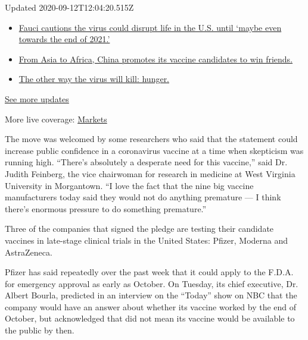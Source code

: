 Updated 2020-09-12T12:04:20.515Z

\begin{itemize}
\tightlist
\item
  \href{https://www.nytimes3xbfgragh.onion/2020/09/11/world/covid-19-coronavirus.html?action=click\&pgtype=Article\&state=default\&region=MAIN_CONTENT_1\&context=storylines_live_updates\#link-dfb8a16}{Fauci
  cautions the virus could disrupt life in the U.S. until `maybe even
  towards the end of 2021.'}
\item
  \href{https://www.nytimes3xbfgragh.onion/2020/09/11/world/covid-19-coronavirus.html?action=click\&pgtype=Article\&state=default\&region=MAIN_CONTENT_1\&context=storylines_live_updates\#link-7104d154}{From
  Asia to Africa, China promotes its vaccine candidates to win friends.}
\item
  \href{https://www.nytimes3xbfgragh.onion/2020/09/11/world/covid-19-coronavirus.html?action=click\&pgtype=Article\&state=default\&region=MAIN_CONTENT_1\&context=storylines_live_updates\#link-393ad215}{The
  other way the virus will kill: hunger.}
\end{itemize}

\href{https://www.nytimes3xbfgragh.onion/2020/09/11/world/covid-19-coronavirus.html?action=click\&pgtype=Article\&state=default\&region=MAIN_CONTENT_1\&context=storylines_live_updates}{See
more updates}

More live coverage:
\href{https://www.nytimes3xbfgragh.onion/live/2020/09/11/business/stock-market-today-coronavirus?action=click\&pgtype=Article\&state=default\&region=MAIN_CONTENT_1\&context=storylines_live_updates}{Markets}

The move was welcomed by some researchers who said that the statement
could increase public confidence in a coronavirus vaccine at a time when
skepticism was running high. ``There's absolutely a desperate need for
this vaccine,'' said Dr. Judith Feinberg, the vice chairwoman for
research in medicine at West Virginia University in Morgantown. ``I love
the fact that the nine big vaccine manufacturers today said they would
not do anything premature --- I think there's enormous pressure to do
something premature.''

Three of the companies that signed the pledge are testing their
candidate vaccines in late-stage clinical trials in the United States:
Pfizer, Moderna and AstraZeneca.

Pfizer has said repeatedly over the past week that it could apply to the
F.D.A. for emergency approval as early as October. On Tuesday, its chief
executive, Dr. Albert Bourla, predicted in an interview on the ``Today''
show on NBC that the company would have an answer about whether its
vaccine worked by the end of October, but acknowledged that did not mean
its vaccine would be available to the public by then.


